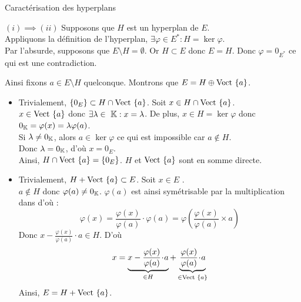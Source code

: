 \documentclass{article}
\begin{document}
	\begin{question_kholle}
		[Soit $H$ un \sev de $E$.
		Les conditions suivantes sont équivalentes :
		\begin{propositions}
			\item $H$ est un hyperplan de $E$ :
			$\exists \varphi \in E^* : H = \ker \varphi$
			\item $H$ admet une droite vectorielle comme supplémentaire :
			$\exists a \in E \setminus \{0_E\} : H \oplus \Vect{\{a\}} = E$
		\end{propositions}]
		{Caractérisation des hyperplans}
		
		$(i) \implies (ii)$ Supposons que $H$ est un hyperplan de $E$. \\
		Appliquons la définition de l'hyperplan, $\exists \varphi \in E^* : H = \ker \varphi$. \\
		Par l'absurde, supposons que $E \setminus H = \emptyset$. Or $H \subset E$ donc $E = H$. Donc $\varphi = 0_{E^*}$ ce qui est une contradiction.

		Ainsi fixons $a \in E \setminus H$ quelconque.
		Montrons que $E = H \oplus \text{Vect }{\{a\}}$.
		\begin{itemize}[label=$\star$]
			\item Trivialement, $\{0_E\} \subset H \cap \text{Vect }{\{a\}}$.
			Soit $x \in H \cap \text{Vect }{\{a\}}$. \\
			$x \in \text{Vect }{\{a\}}$ donc $\exists \lambda \in  \K : x = \lambda$. De plus, $x \in H = \ker \varphi$ donc $0_{\mathbb K} = \varphi(x) = \lambda \varphi(a)$. \\
			Si $\lambda \neq 0_{\mathbb K}$, alors $a \in \ker \varphi$ ce qui est impossible car $a \notin H$. \\
			Donc $\lambda = 0_{\mathbb K}$, d'où $x = 0_E$. \\
			Ainsi, $H \cap \text{Vect }{\{a\}} = \{0_E\}$. $H$ et $\text{Vect }{\{a\}}$ sont en somme directe.
			\item Trivialement, $H + \text{Vect }{\{a\}} \subset E$.
			Soit $x \in E$ \fq. \\
			$a \notin H$ donc $\varphi(a) \neq 0_{\mathbb K}$. $\varphi(a)$ est ainsi symétrisable par la multiplication dans \K d'où :
			\begin{equation*}
				\varphi(x)
				= \frac{\varphi(x)}{\varphi(a)} \cdot \varphi(a)
				= \varphi\left( \frac{\varphi(x)}{\varphi(a)} \times a \right)
			\end{equation*}
			Donc $x - \frac{\varphi(x)}{\varphi(a)} \!\cdot\! a \in H$. D'où
			\begin{equation*}
				x =
				\underbrace{x - \frac{\varphi(x)}{\varphi(a)} \!\cdot\! a}_{\in H}
				+ \underbrace{\frac{\varphi(x)}{\varphi(a)} \!\cdot\! a}_{\in \text{Vect }{\{a\}}}
			\end{equation*}
			Ainsi, $E = H + \text{Vect }{\{a\}}$.
		\end{itemize}
		

\end{question_kholle}
\end{document}
